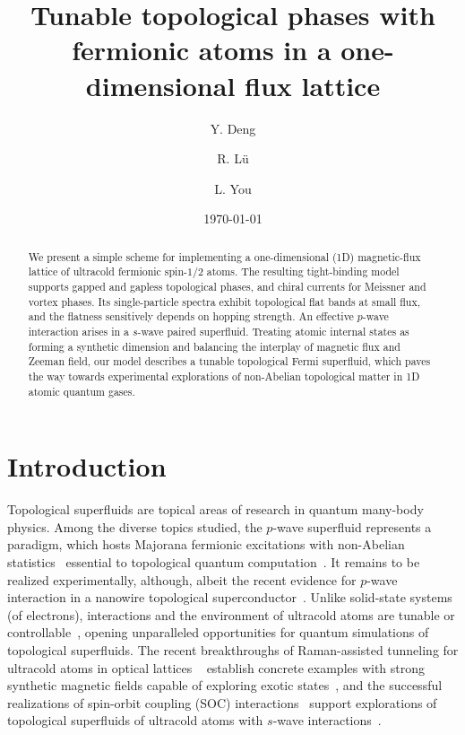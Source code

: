 \documentclass[twocolumn,prl,superscriptaddress,amsmath,amssymb]{revtex4} %
\begin{document}
\title{Tunable topological phases with fermionic atoms in a one-dimensional flux lattice}

\author{Y. Deng}

\author{R. L\"u}
\author{L. You}

\date{\today}
\begin{abstract}
We present a simple scheme for implementing a one-dimensional (1D) magnetic-flux lattice of ultracold fermionic spin-$1/2$ atoms. The resulting tight-binding model supports gapped and gapless topological phases, and chiral currents for Meissner and vortex phases. Its single-particle spectra exhibit topological flat bands at small flux, and the flatness sensitively depends on hopping strength. An effective $p$-wave interaction arises in a $s$-wave paired superfluid. Treating atomic internal states as forming a synthetic dimension and balancing the interplay of magnetic flux and Zeeman field, our model describes
a tunable topological Fermi superfluid, which paves the way towards experimental explorations of non-Abelian topological matter in 1D atomic quantum gases.
\end{abstract}


\maketitle

\section{Introduction}
Topological superfluids are topical areas of research in quantum many-body physics. Among the diverse topics studied, the $p$-wave superfluid represents a paradigm, which hosts Majorana fermionic excitations with non-Abelian statistics~\cite{Ivanov01,Nayak08,Lutchyn10} essential to topological quantum computation~\cite{Kitaev03}. It remains to be realized experimentally, although, albeit the recent evidence for $p$-wave interaction in a nanowire topological superconductor~\cite{Mourik12,MTDeng,Das12}. Unlike solid-state systems (of electrons), interactions and the environment of
ultracold atoms are tunable or controllable~\cite{Bloch2008,Chin2010}, opening unparalleled opportunities for quantum simulations of topological superfluids. The recent breakthroughs of Raman-assisted tunneling for ultracold atoms in optical lattices ~\cite{Aidelsburger11,Kennedy15} establish concrete examples with strong synthetic magnetic fields
capable of exploring exotic states~\cite{Dalibard2011,Goldman2014}, and the successful realizations of spin-orbit coupling (SOC) interactions~\cite{Wu15,Huang15} support explorations of topological superfluids of ultracold atoms with $s$-wave interactions~\cite{Zhang08,Sato09,Zhai11}.
\end{document}
